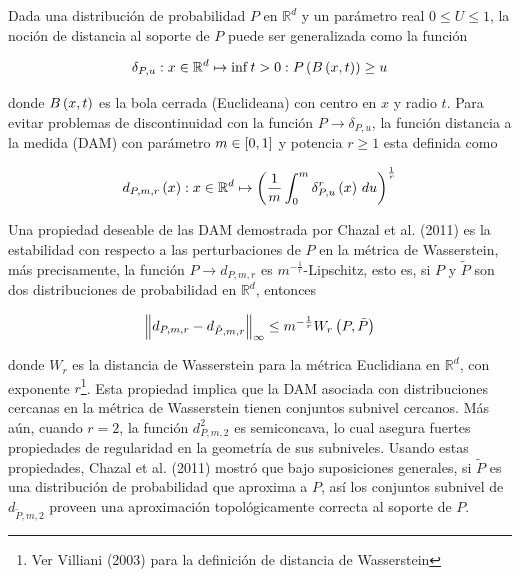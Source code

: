 Dada una distribuci\'on de probabilidad $P$ en $\mathbb{R}^{d}$ y un par\'ametro real $0\leq U\leq 1$,
la noci\'on de distancia al soporte de $P$ puede ser generalizada como la funci\'on

\begin{equation*}
    \delta_{P,u}:x\in\mathbb{R}^{d}\mapsto\inf{t>0:P\left(B\left(x,t\right)\right)\geq u}
\end{equation*}

donde $B\left(x,t\right)$ es la bola cerrada (Euclideana) con centro en $x$ y radio $t$. Para evitar problemas
de discontinuidad con la funci\'on $P\rightarrow \delta_{P,u}$, la funci\'on distancia a la medida (DAM)
con par\'ametro $m\in\left[0,1\right]$ y potencia $r\geq 1$ esta definida como

\begin{equation}
    d_{P,m,r}\left(x\right):
    x\in\mathbb{R}^{d}\mapsto\left(\frac{1}{m}\int_{0}^{m}\delta_{P,u}^{r}\left(x\right)\,du\right)^{\frac{1}{r}}
\end{equation}

\par Una propiedad deseable de las DAM demostrada por Chazal et al. (2011)\cite{Chazal2011b} es la
estabilidad con respecto a las perturbaciones de $P$ en la m\'etrica de Wasserstein, m\'as precisamente,
la funci\'on $P\rightarrow d_{P,m,r}$ es $m^{-\frac{1}{r}}$-Lipschitz, esto es, si $P$ y $\tilde{P}$ son
dos distribuciones de probabilidad en $\mathbb{R}^{d}$, entonces

\begin{equation}
    \left\|d_{P,m,r}-d_{\tilde{P},m,r}\right\|_{\infty}\leq m^{-\frac{1}{r}}W_{r}\left(P,\tilde{P}\right)
\end{equation}

donde $W_{r}$ es la distancia de Wasserstein para la m\'etrica Euclidiana en $\mathbb{R}^{d}$, con
exponente $r$\footnote{Ver Villiani (2003)\cite{Villiani2003} para la definici\'on de distancia de
Wasserstein}. Esta propiedad implica que la DAM asociada con distribuciones cercanas en la m\'etrica de
Wasserstein tienen conjuntos subnivel cercanos. M\'as a\'un, cuando $r=2$, la funci\'on
$d_{P,m,2}^{2}$ es semiconcava, lo cual asegura fuertes propiedades de regularidad en la
geometr\'ia de sus subniveles. Usando estas propiedades, Chazal et al. (2011) \cite{Chazal2011b} mostr\'o
que bajo suposiciones generales, si $\tilde{P}$ es una distribuci\'on de probabilidad que aproxima a $P$,
as\'i los conjuntos subnivel de $d_{\tilde{P},m,2}$ proveen una aproximaci\'on topol\'ogicamente
correcta al soporte de $P$.

